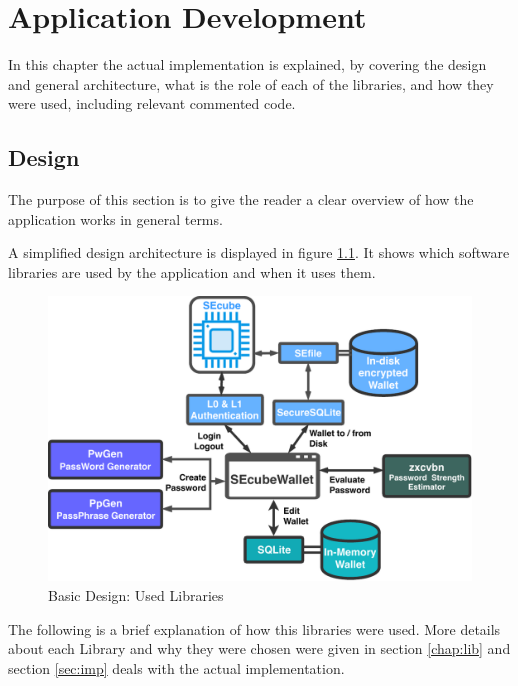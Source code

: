 \chapter{Application Development} \label{chap:dev}

In this chapter the actual implementation is explained, by covering the design and general architecture, what is the role of each of the libraries, and how they were used, including relevant commented code.


\section{Design}

The purpose of this section is to give the reader a clear overview of how the application works in general terms. 

A simplified design architecture is displayed in figure \ref{fig:BasicDesign}. It shows which software libraries are used by the application and when it uses them.


\begin{figure}[ht]
	\centering
	\includegraphics[width=\textwidth]{chapters/figures/development/BasicDesign.pdf}
	\caption{Basic Design: Used Libraries}
	\label{fig:BasicDesign}
\end{figure}

The following is a brief explanation of how this libraries were used. More details about each Library and why they were chosen were given in section \ref{chap:lib} and section \ref{sec:imp} deals with the actual implementation.

